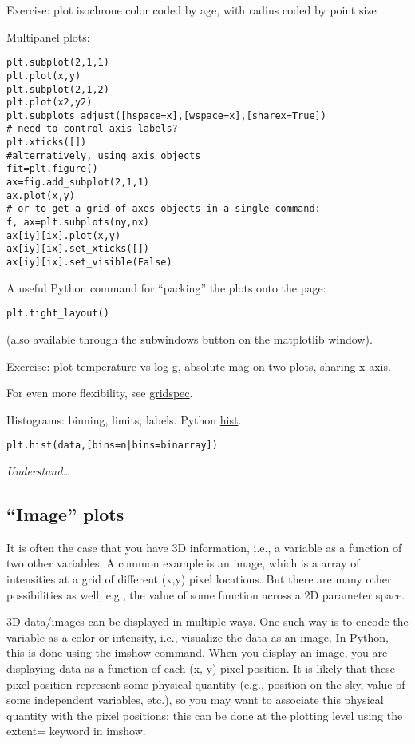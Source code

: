 \documentclass{article}
\newcommand{\test}[1]{%
    \begin{center}
        \colorbox{hl}{\parbox{0.9\textwidth}{\emph{\centering #1}}}
    \end{center}}
\begin{document}
Exercise: plot isochrone color coded by age, with radius coded by
point size

Multipanel plots:
\begin{verbatim}
plt.subplot(2,1,1)
plt.plot(x,y)
plt.subplot(2,1,2)
plt.plot(x2,y2)
plt.subplots_adjust([hspace=x],[wspace=x],[sharex=True])
# need to control axis labels?
plt.xticks([])
#alternatively, using axis objects
fit=plt.figure()
ax=fig.add_subplot(2,1,1)
ax.plot(x,y)
# or to get a grid of axes objects in a single command:
f, ax=plt.subplots(ny,nx)
ax[iy][ix].plot(x,y)
ax[iy][ix].set_xticks([])
ax[iy][ix].set_visible(False)
\end{verbatim}
A useful Python command for ``packing'' the plots onto the page:
\begin{verbatim}
plt.tight_layout()
\end{verbatim}
(also available through the subwindows button on the matplotlib
window).

Exercise: plot temperature vs log g, absolute mag on two plots,
sharing x axis.

For even more flexibility, see
\href{http://matplotlib.org/users/gridspec.html}{gridspec}.

Histograms: binning, limits, labels. Python
\href{http://matplotlib.org/api/pyplot_api.html#matplotlib.pyplot.hist}
{hist}.
\begin{verbatim}
plt.hist(data,[bins=n|bins=binarray])
\end{verbatim}

\test{Understand\ldots}

\subsection{``Image'' plots}

It is often the case that you have 3D information, i.e., a variable as
a function of two other variables. A common example is an image, which
is a array of intensities at a grid of different (x,y) pixel
locations. But there are many other possibilities as well, e.g., the
value of some function across a 2D parameter space.

3D data/images can be displayed in multiple ways. One such way is to
encode the variable as a color or intensity, i.e., visualize the data
as an image. In Python, this is done using the
\href{http://matplotlib.org/api/pyplot_api.html#matplotlib.pyplot.imshow}
{imshow} command. When
you display an image, you are displaying data as a function of each
(x, y) pixel position. It is likely that these pixel position
represent some physical quantity (e.g., position on the sky, value of
some independent variables, etc.), so you may want to associate this
physical quantity with the pixel positions; this can be done at the
plotting level using the extent= keyword in imshow.
\end{document}
